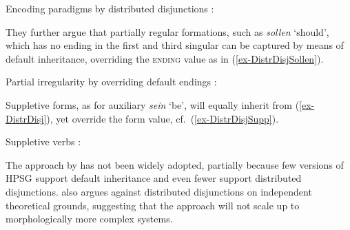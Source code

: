 \documentclass[output=paper
 	        ,biblatex
                ,babelshorthands
                ,newtxmath
                ,draftmode
                ,colorlinks, citecolor=brown
]{langscibook}
\begin{document}
\ea
\label{ex-DistrDisj}
Encoding paradigms by distributed disjunctions \citep[105]{Krieger:Nerbonne:93}:\\
\z  


They further argue that partially regular formations, such as
\textit{sollen} `should', which has no ending in the first and third
singular can be captured by means of default inheritance, overriding
the \textsc{ending} value as in (\ref{ex-DistrDisjSollen}).  

\ea
\label{ex-DistrDisjSollen}

Partial irregularity by overriding default endings \citep[105]{Krieger:Nerbonne:93}:\\
\z

Suppletive forms, as for auxiliary \textit{sein} `be', will equally
inherit from (\ref{ex-DistrDisj}), yet override the form value,
cf.\ (\ref{ex-DistrDisjSupp}).  

\ea
\label{ex-DistrDisjSupp}
Suppletive verbs \citep[106]{Krieger:Nerbonne:93}:\\
\z

The approach by \citet{Krieger:Nerbonne:93} has not been widely
adopted, partially because few versions of HPSG support default
inheritance and even fewer support distributed
disjunctions. \citet[176--178]{Koenig99} also argues against distributed
disjunctions on independent theoretical grounds, suggesting that the
approach will not scale up to morphologically more complex systems.  

\paragraph*{\citet{Koenig99}}
\end{document}
